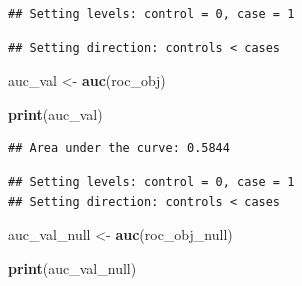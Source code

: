 \documentclass[
]{article}
\newenvironment{Shaded}{\begin{snugshade}}{\end{snugshade}}
\newcommand{\AttributeTok}[1]{\textcolor[rgb]{0.13,0.29,0.53}{#1}}
\newcommand{\CommentTok}[1]{\textcolor[rgb]{0.56,0.35,0.01}{\textit{#1}}}
\newcommand{\FunctionTok}[1]{\textcolor[rgb]{0.13,0.29,0.53}{\textbf{#1}}}
\newcommand{\NormalTok}[1]{#1}
\newcommand{\OtherTok}[1]{\textcolor[rgb]{0.56,0.35,0.01}{#1}}
\newcommand{\SpecialCharTok}[1]{\textcolor[rgb]{0.81,0.36,0.00}{\textbf{#1}}}
\newcommand{\StringTok}[1]{\textcolor[rgb]{0.31,0.60,0.02}{#1}}
\begin{document}
\begin{verbatim}
## Setting levels: control = 0, case = 1
\end{verbatim}

\begin{verbatim}
## Setting direction: controls < cases
\end{verbatim}

\begin{Shaded}
\begin{Highlighting}[]
\NormalTok{auc\_val }\OtherTok{\textless{}{-}} \FunctionTok{auc}\NormalTok{(roc\_obj)}


\FunctionTok{print}\NormalTok{(auc\_val)}
\end{Highlighting}
\end{Shaded}

\begin{verbatim}
## Area under the curve: 0.5844
\end{verbatim}

\begin{Shaded}
\end{Shaded}

\begin{verbatim}
## Setting levels: control = 0, case = 1
## Setting direction: controls < cases
\end{verbatim}

\begin{Shaded}
\begin{Highlighting}[]
\NormalTok{auc\_val\_null }\OtherTok{\textless{}{-}} \FunctionTok{auc}\NormalTok{(roc\_obj\_null)}


\FunctionTok{print}\NormalTok{(auc\_val\_null)}
\end{Highlighting}
\end{Shaded}
\end{document}
